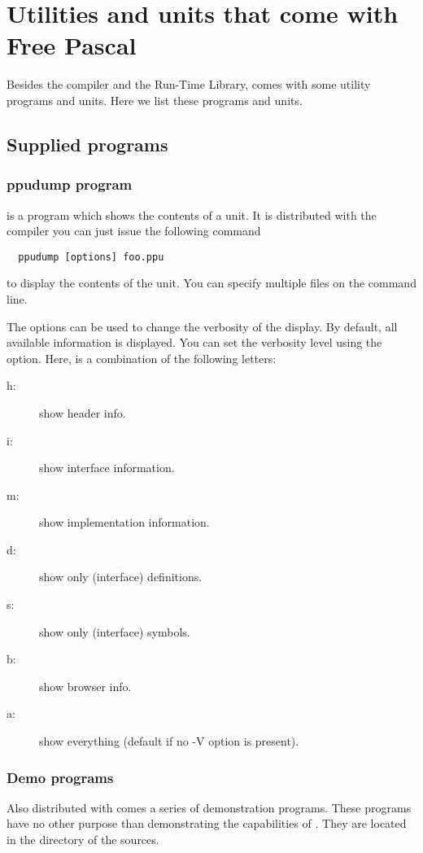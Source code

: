 \documentclass{report}
\begin{document}

\chapter{Utilities and units that come with Free Pascal}
\label{ch:Utilities}
Besides the compiler and the Run-Time Library, \fpc comes with some utility
programs and units. Here we list these programs and units. 

\section{Supplied programs}

\subsection{ppudump program}

 is a program which shows the contents of a \fpc unit. It
is distributed with the compiler you can just issue the following command
\begin{verbatim}
  ppudump [options] foo.ppu
\end{verbatim}
to display the contents of the  unit. You can specify multiple
files on the command line.

The options can be used to change the verbosity of the display. By default,
all available information is displayed. 
You can set the verbosity level using the  option. 
Here,  is a combination of the following
letters:
\begin{description}
\item [h:\ ] show header info.
\item [i:\ ] show interface information.
\item [m:\ ] show implementation information.
\item [d:\ ] show only (interface) definitions.
\item [s:\ ] show only (interface) symbols.
\item [b:\ ] show browser info.
\item [a:\ ] show everything (default if no -V option is present).
\end{description}

\subsection{Demo programs}
Also distributed with \fpc comes a series of demonstration programs.
These programs have no other purpose than demonstrating the capabilities of
\fpc. They are located in the  directory of the sources.
\end{document}
